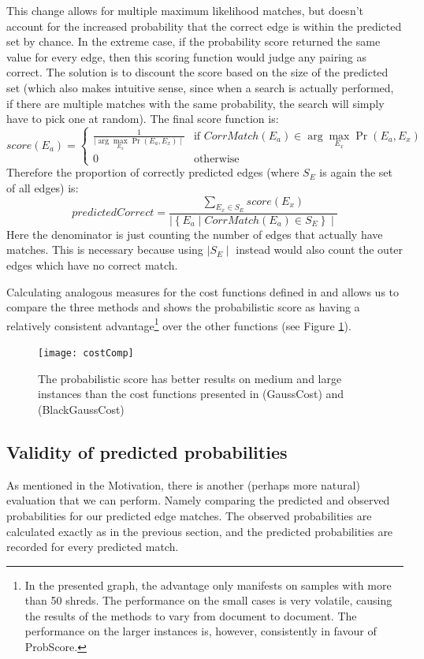 This change allows for multiple maximum likelihood matches, but doesn't account for the increased probability that the correct edge is within the predicted set by chance. In the extreme case, if the probability score returned the same value for every edge, then this scoring function would judge any pairing as correct. The solution is to discount the score based on the size of the predicted set (which also makes intuitive sense, since when a search is actually performed, if there are multiple matches with the same probability, the search will simply have to pick one at random). The final score function is:
\[
score(E_a) =
\left\{
	\begin{array}{ll}
		\frac{1}{\mid \arg\max_{E_x} \Pr(E_a,E_x) \mid}  & \mbox{if } CorrMatch(E_a) \in \arg\max_{E_x} \Pr(E_a,E_x) \\
		0 & \mbox{otherwise } 
	\end{array}
\right. 
\]
Therefore the proportion of correctly predicted edges (where \(S_E\) is again the set of all edges) is:
\[
predictedCorrect = \frac{\sum_{E_x \in S_E} score(E_x)}{\mid\left\{E_a \mid CorrMatch(E_a) \in S_E\right\}\mid }
\]
Here the denominator is just counting the number of edges that actually have matches. This is necessary because using \(\mid S_E \mid \) instead would also count the outer edges which have no correct match.

Calculating analogous measures for the cost functions defined in \cite{P1} and \cite{P2} allows us to compare the three methods and shows the probabilistic score as having a relatively consistent advantage\footnote{In the presented graph, the advantage only manifests on samples with more than 50 shreds. The performance on the small cases is very volatile, causing the results of the methods to vary from document to document. The performance on the larger instances is, however, consistently in favour of ProbScore.} over the other functions (see Figure \ref{fig:costComp}).

\begin{figure}[h]
\centering
\texttt{[image: costComp]}
\caption{The probabilistic score has better results on medium and large instances than the cost functions presented in \cite{P1} (GaussCost) and \cite{P2} (BlackGaussCost)}
\label{fig:costComp}
\end{figure}

\subsection{Validity of predicted probabilities}
As mentioned in the Motivation, there is another (perhaps more natural) evaluation that we can perform. Namely comparing the predicted and observed probabilities for our predicted edge matches. The observed probabilities are calculated exactly as in the previous section, and the predicted probabilities are recorded for every predicted match. 

